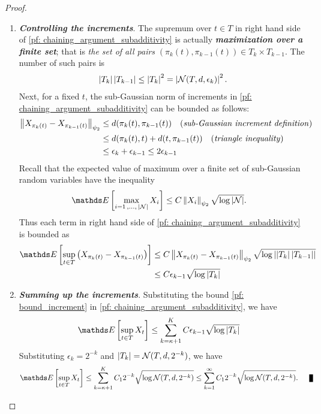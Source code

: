 \documentclass[11pt]{article}
\begin{document}
\begin{itemize}
\begin{proof}
\begin{enumerate}
\item \textbf{\emph{Controlling the increments}}. The supremum over $t\in T$ in right hand side of \eqref{pf: chaining_argument_subadditivity} is actually \textbf{\emph{maximization over a finite set}}; that is \emph{the set of all pairs} $(\pi_k(t), \pi_{k-1}(t)) \in T_{k} \times T_{k-1}$. The number of such pairs is
\begin{align*}
\left\lvert T_k \right\rvert \left\lvert T_{k-1} \right\rvert \le \left\lvert T_k \right\rvert^2 = \left\lvert  {\mathcal N}(T, d, \epsilon_k) \right\rvert^2.
\end{align*} Next, for a fixed $t$, the sub-Gaussian norm of increments in \eqref{pf: chaining_argument_subadditivity}  can be bounded as follows:
\begin{align*}
 \left\|X_{\pi_k(t)} - X_{\pi_{k-1}(t)}\right\|_{\psi_2} &\le d(\pi_k(t), \pi_{k-1}(t)) \quad (\text{\emph{sub-Gaussian increment definition}})\\
&\le d(\pi_k(t), t) + d(t, \pi_{k-1}(t)) \quad (\text{\emph{triangle inequality}})\\
&\le \epsilon_k + \epsilon_{k-1} \le 2\epsilon_{k-1}
\end{align*} Recall that the expected value of maximum over a finite set of sub-Gaussian random variables have the inequality 
\begin{align*}
\E{}{\max\limits_{i=1 \xdotx{,} \abs{\cN}} X_i} &\le C \norm{X_i}{\psi_2}\sqrt{\log \abs{\cN}}.
\end{align*} Thus each term in right hand side of \eqref{pf: chaining_argument_subadditivity} is bounded as
\begin{align}
\E{}{\sup_{t\in T}\paren{X_{\pi_k(t)} - X_{\pi_{k-1}(t)}}} &\le C  \norm{X_{\pi_k(t)} - X_{\pi_{k-1}(t)}}{\psi_2}\sqrt{\log \abs{\abs{T_k} \abs{T_{k-1}}}} \nonumber\\
&\le C \epsilon_{k-1} \sqrt{\log \abs{T_k }} \label{pf: bound_increment}
\end{align}

\item \textbf{\emph{Summing up the increments}}. Substituting the bound \eqref{pf: bound_increment} in \eqref{pf: chaining_argument_subadditivity}, we have
\begin{align}
\E{}{\sup_{t\in T}X_t} &\le \sum_{k=\kappa+1}^{K}C \epsilon_{k-1} \sqrt{\log \abs{T_k }} \label{pf: bound_increment_2}
\end{align} Substituting $\epsilon_k = 2^{-k}$ and $\left\lvert T_k \right\rvert = {\mathcal N}(T, d, 2^{-k}) $, we have
\begin{align*}
\E{}{\sup_{t\in T}X_t} &\le \sum_{k=\kappa+1}^{K}C_1 2^{-k} \sqrt{\log \cN(T, d, 2^{-k}) } \le  \sum_{k=1}^{\infty}C_1 2^{-k} \sqrt{\log \cN(T, d, 2^{-k}) }. \qed
\end{align*}
\end{enumerate}
\end{proof}


\end{itemize}
\end{document}
